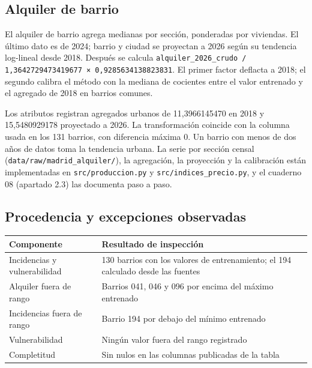 \documentclass[11pt,a4paper]{article}
\newcommand{\thead}[1]{\textbf{#1}}
\newcounter{anexo}
\newcounter{anexosub}[anexo]
\begin{document}
%
\subsection*{\theanexo\hspace{0.3em}\hspace{0.45em}Alquiler de barrio}

El alquiler de barrio agrega medianas por sección, ponderadas por viviendas. El último dato es de 2024; barrio y ciudad se proyectan a 2026 según su tendencia log-lineal desde 2018. Después se calcula \texttt{alquiler\_2026\_crudo / 1,3642729473419677 × 0,9285634138823831}. El primer factor deflacta a 2018; el segundo calibra el método con la mediana de cocientes entre el valor entrenado y el agregado de 2018 en barrios comunes.

Los atributos registran agregados urbanos de 11,3966145470 en 2018 y 15,5480929178 proyectado a 2026. La transformación coincide con la columna usada en los 131 barrios, con diferencia máxima 0. Un barrio con menos de dos años de datos toma la tendencia urbana. La serie por sección censal (\texttt{data/raw/madrid\_alquiler/}), la agregación, la proyección y la calibración están implementadas en \texttt{src/produccion.py} y \texttt{src/indices\_precio.py}, y el cuaderno 08 (apartado 2.3) las documenta paso a paso.

%
\subsection*{\theanexo\hspace{0.3em}\hspace{0.45em}Procedencia y excepciones observadas}

\begin{center}
\begin{tabularx}{\linewidth}{@{}L L@{}}
\toprule
\thead{Componente} & \thead{Resultado de inspección} \\
\midrule
Incidencias y vulnerabilidad & 130 barrios con los valores de entrenamiento; el 194 calculado desde las fuentes \\
Alquiler fuera de rango & Barrios 041, 046 y 096 por encima del máximo entrenado \\
Incidencias fuera de rango & Barrio 194 por debajo del mínimo entrenado \\
Vulnerabilidad & Ningún valor fuera del rango registrado \\
Completitud & Sin nulos en las columnas publicadas de la tabla \\
\bottomrule
\end{tabularx}
\end{center}
\end{document}
